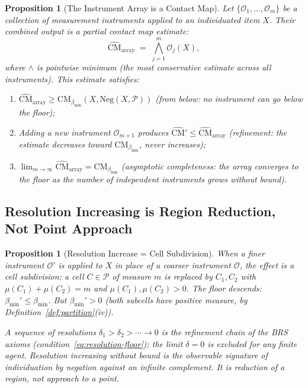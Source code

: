 \documentclass[12pt,a4paper,twocolumn]{article}
\theoremstyle{plain}
\newtheorem{proposition}[theorem]{Proposition}
\theoremstyle{definition}
\theoremstyle{remark}
\newcommand{\Part}{\mathcal{P}}
\newcommand{\CM}{\mathrm{CM}}
\newcommand{\bmin}{\beta_{\min}}
\newcommand{\Neg}{\mathrm{Neg}}
\newcommand{\CMbmin}{\CM_{\bmin}}
\begin{document}
\begin{proposition}[The Instrument Array is a Contact Map]
\label{prop:instruments-contact-map}
Let $\{\mathcal{O}_1, \ldots, \mathcal{O}_m\}$ be a collection of
measurement instruments applied to an individuated item $X$.  Their combined
output is a partial contact map estimate:
\begin{equation}
  \hat{\CM}_{\text{array}} \;=\;
    \bigwedge_{j=1}^m \mathcal{O}_j(X),
\end{equation}
where $\wedge$ is pointwise minimum (the most conservative estimate across
all instruments).  This estimate satisfies:
\begin{enumerate}[label=(\roman*)]
  \item $\hat{\CM}_{\text{array}} \geq \CMbmin(X, \Neg(X, \Part))$
    (from below: no instrument can go below the floor);
  \item Adding a new instrument $\mathcal{O}_{m+1}$ produces
    $\hat{\CM}' \leq \hat{\CM}_{\text{array}}$ (refinement: the estimate
    decreases toward $\CMbmin$, never increases);
  \item $\lim_{m \to \infty} \hat{\CM}_{\text{array}} = \CMbmin$
    (asymptotic completeness: the array converges to the floor as the
    number of independent instruments grows without bound).
\end{enumerate}
\end{proposition}

\subsection{Resolution Increasing is Region Reduction, Not Point Approach}

\begin{proposition}[Resolution Increase = Cell Subdivision]
\label{prop:resolution-cell}
When a finer instrument $\mathcal{O}'$ is applied to $X$ in place of a
coarser instrument $\mathcal{O}$, the effect is a cell subdivision: a cell
$C \in \Part$ of measure $m$ is replaced by $C_1, C_2$ with $\mu(C_1) +
\mu(C_2) = m$ and $\mu(C_1), \mu(C_2) > 0$.  The floor descends:
$\bmin' \leq \bmin$.  But $\bmin' > 0$ (both subcells have positive
measure, by Definition~\ref{def:partition}(iv)).

A sequence of resolutions $\delta_1 > \delta_2 > \cdots \to 0$ is the
refinement chain of the BRS axioms (condition~\eqref{eq:resolution-floor});
the limit $\delta = 0$ is excluded for any finite agent.  Resolution
increasing without bound is the observable signature of individuation by
negation against an infinite complement.  It is \emph{reduction of a
region}, not \emph{approach to a point}.
\end{proposition}
\end{document}
